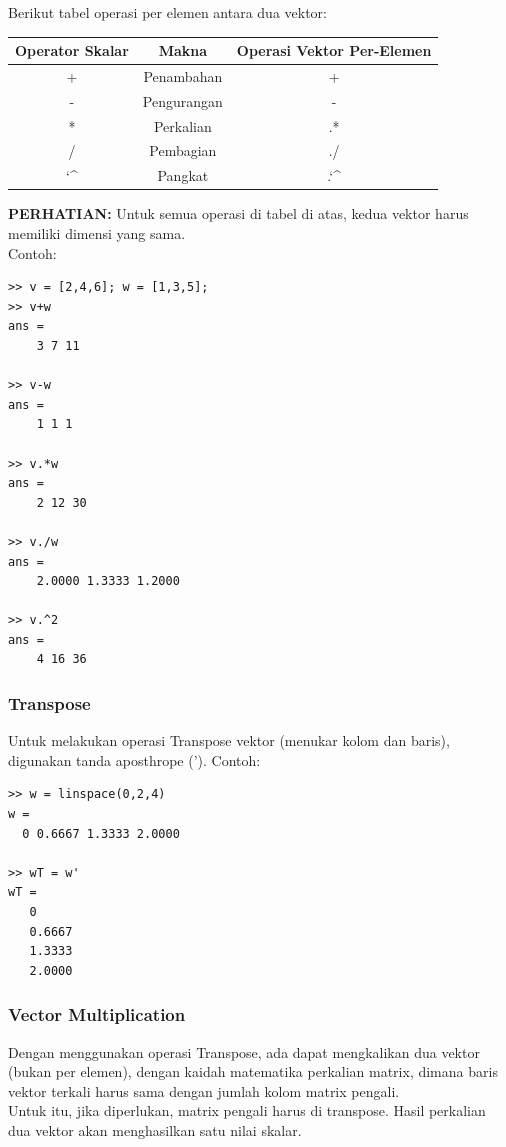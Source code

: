 \documentclass[12pt]{book}
\begin{document}
	Berikut tabel operasi per elemen antara dua vektor:
	\begin{center}
		\begin{tabular}{|c|c|c|}
			\hline
			Operator Skalar & Makna & Operasi Vektor Per-Elemen\\
			\hline\hline
			+ & Penambahan & +  \\
			\hline
			- & Pengurangan & - \\
			\hline
			* & Perkalian & .* \\
			\hline
			/ & Pembagian & ./ \\
			\hline
			\char`\^ & Pangkat & .\char`\^   \\
			\hline
		\end{tabular}
	\end{center}

	\textbf{PERHATIAN:} Untuk semua operasi di tabel di atas, kedua vektor harus memiliki dimensi yang sama.\\

	Contoh:
	\begin{verbatim}
>> v = [2,4,6]; w = [1,3,5];
>> v+w
ans =
    3 7 11

>> v-w
ans =
    1 1 1

>> v.*w
ans =
    2 12 30

>> v./w
ans =
    2.0000 1.3333 1.2000

>> v.^2
ans =
    4 16 36
	\end{verbatim}

	\subsubsection{Transpose}

	Untuk melakukan operasi Transpose vektor (menukar kolom dan baris), digunakan tanda aposthrope (').
	Contoh:
	\begin{verbatim}
>> w = linspace(0,2,4)
w =
  0 0.6667 1.3333 2.0000

>> wT = w'
wT =
   0
   0.6667
   1.3333
   2.0000
	\end{verbatim}

	\newpage
	\subsubsection{Vector Multiplication}

	Dengan menggunakan operasi Transpose, ada dapat mengkalikan dua vektor (bukan per elemen),
	dengan kaidah matematika perkalian matrix, dimana baris vektor terkali harus sama dengan jumlah kolom matrix pengali.
	\\
	Untuk itu, jika diperlukan, matrix pengali harus di transpose.
	Hasil perkalian dua vektor akan menghasilkan satu nilai skalar.
\end{document}
